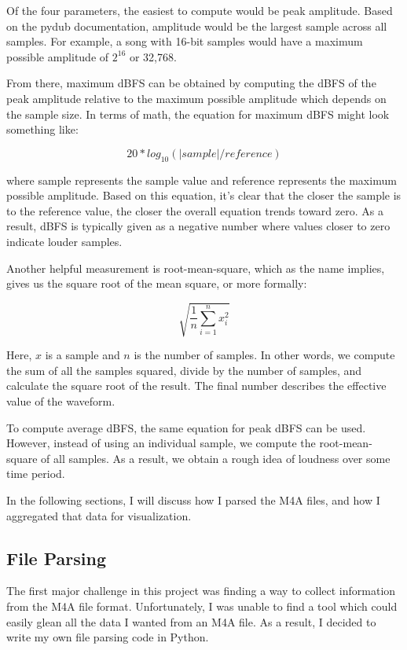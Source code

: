 \documentclass[journal]{vgtc}                %
\begin{document}
Of the four parameters, the easiest to compute would be peak amplitude. Based
on the pydub documentation, amplitude would be the largest sample across
all samples. For example, a song with 16-bit samples would have a maximum
possible amplitude of $2 ^ {16}$ or 32,768.

From there, maximum dBFS can be obtained by computing the dBFS of the peak
amplitude relative to the maximum possible amplitude which depends on the
sample size. In terms of math, the equation for maximum dBFS might look
something like:

\[ 20 * log_{10}( | sample | / reference ) \]

where sample represents the sample value and reference represents the maximum
possible amplitude. Based on this equation, it's clear that the closer the sample
is to the reference value, the closer the overall equation trends toward zero.
As a result, dBFS is typically given as a negative number where values closer
to zero indicate louder samples.

Another helpful measurement is root-mean-square, which as the name implies, gives
us the square root of the mean square, or more formally:

\[ \sqrt{\frac{1}{n} \sum_{i=1}^{n} x_{i}^2} \]

Here, $x$ is a sample and $n$ is the number of samples. In other words, we
compute the sum of all the samples squared, divide by the number of samples,
and calculate the square root of the result. The final number describes the
effective value of the waveform.

To compute average dBFS, the same equation for peak dBFS can be used. However,
instead of using an individual sample, we compute the root-mean-square of all samples. As
a result, we obtain a rough idea of loudness over some time period.

In the following sections, I will discuss how I parsed the M4A files, and how
I aggregated that data for visualization.

\subsection{File Parsing}

The first major challenge in this project was finding a way to collect
information from the M4A file format. Unfortunately, I was unable to find a
tool which could easily glean all the data I wanted from an M4A file. As a result,
I decided to write my own file parsing code in Python.
\end{document}
